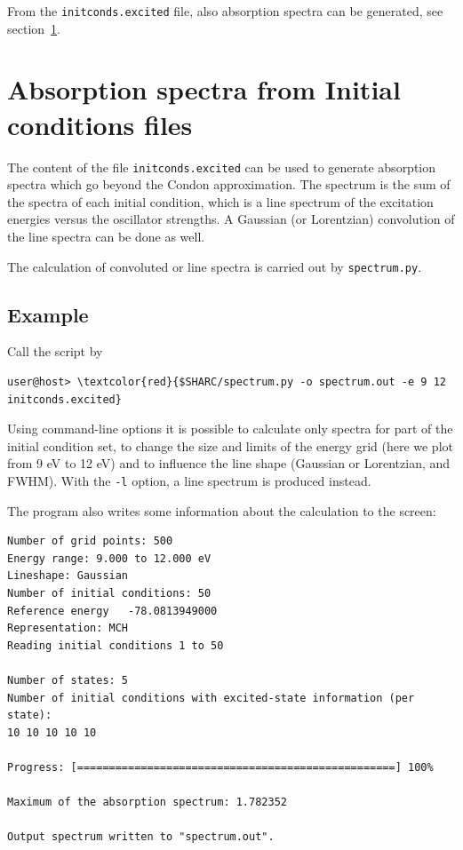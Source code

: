 \documentclass[a4paper,11pt,DIV=15,openany]{scrbook}
\newcommand{\ttt}[1]{\texttt{#1}}
\begin{document}
From the \ttt{initconds.excited} file, also absorption spectra can be generated, see section~\ref{sec:absspec}.




\clearpage
\section{Absorption spectra from Initial conditions files}\label{sec:absspec}

The content of the file \ttt{initconds.excited} can be used to generate absorption spectra which go beyond the Condon approximation. The spectrum is the sum of the spectra of each initial condition, which is a line spectrum of the excitation energies versus the oscillator strengths. A Gaussian (or Lorentzian) convolution of the line spectra can be done as well.

The calculation of convoluted or line spectra is carried out by \ttt{spectrum.py}. 

\subsection{Example}

Call the script by
\begin{Verbatim}[commandchars=\\\{\}]
user@host> \textcolor{red}{$SHARC/spectrum.py -o spectrum.out -e 9 12 initconds.excited}
\end{Verbatim}
Using command-line options it is possible to calculate only spectra for part of the initial condition set, to change the size and limits of the energy grid (here we plot from 9 eV to 12 eV) and to influence the line shape (Gaussian or Lorentzian, and FWHM). With the \ttt{-l} option, a line spectrum is produced instead.

The program also writes some information about the calculation to the screen:
\begin{oframed}
\footnotesize\begin{Verbatim}[commandchars=\\\{\}]
Number of grid points: 500
Energy range: 9.000 to 12.000 eV
Lineshape: Gaussian
Number of initial conditions: 50
Reference energy   -78.0813949000
Representation: MCH
Reading initial conditions 1 to 50

Number of states: 5
Number of initial conditions with excited-state information (per state):
10 10 10 10 10 

Progress: [==================================================] 100%

Maximum of the absorption spectrum: 1.782352

Output spectrum written to "spectrum.out".
\end{Verbatim}
\end{oframed}
\end{document}
